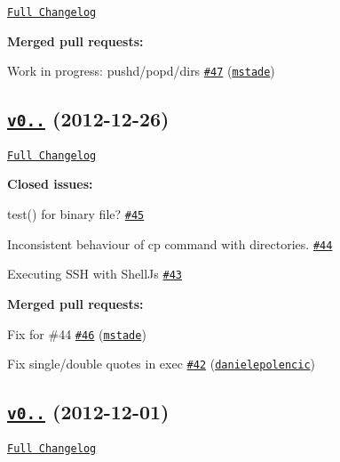 \href{https://github.com/shelljs/shelljs/compare/v0.1.0...v0.1.1}{\tt Full Changelog}

{\bfseries Merged pull requests\+:}


\begin{DoxyItemize}
\item Work in progress\+: pushd/popd/dirs \href{https://github.com/shelljs/shelljs/pull/47}{\tt \#47} (\href{https://github.com/mstade}{\tt mstade})
\end{DoxyItemize}

\subsection*{\href{https://github.com/shelljs/shelljs/tree/v0.1.0}{\tt v0..} (2012-\/12-\/26)}

\href{https://github.com/shelljs/shelljs/compare/v0.0.9...v0.1.0}{\tt Full Changelog}

{\bfseries Closed issues\+:}


\begin{DoxyItemize}
\item test() for binary file? \href{https://github.com/shelljs/shelljs/issues/45}{\tt \#45}
\item Inconsistent behaviour of cp command with directories. \href{https://github.com/shelljs/shelljs/issues/44}{\tt \#44}
\item Executing S\+SH with Shell\+Js \href{https://github.com/shelljs/shelljs/issues/43}{\tt \#43}
\end{DoxyItemize}

{\bfseries Merged pull requests\+:}


\begin{DoxyItemize}
\item Fix for \#44 \href{https://github.com/shelljs/shelljs/pull/46}{\tt \#46} (\href{https://github.com/mstade}{\tt mstade})
\item Fix single/double quotes in exec \href{https://github.com/shelljs/shelljs/pull/42}{\tt \#42} (\href{https://github.com/danielepolencic}{\tt danielepolencic})
\end{DoxyItemize}

\subsection*{\href{https://github.com/shelljs/shelljs/tree/v0.0.9}{\tt v0..} (2012-\/12-\/01)}

\href{https://github.com/shelljs/shelljs/compare/v0.0.8...v0.0.9}{\tt Full Changelog}

